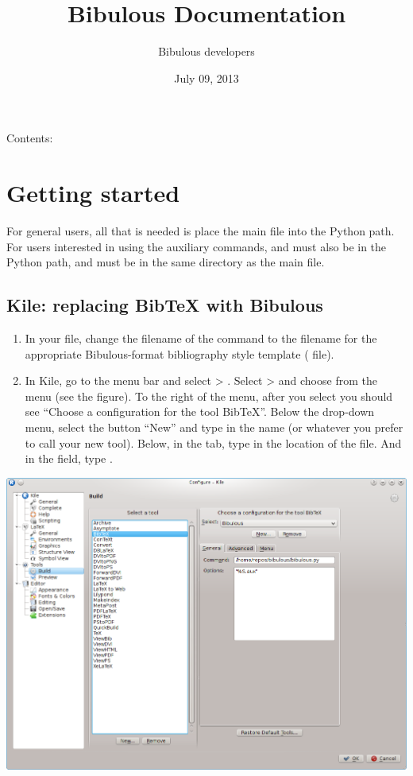 \documentclass[letterpaper,10pt,english]{sphinxmanual}
\title{Bibulous Documentation}
\date{July 09, 2013}
\author{Bibulous developers}
\begin{document}
\maketitle
\tableofcontents
{}\label{index::doc}


Contents:


\chapter{Getting started}
\label{getting_started:bibulous-documentation}\label{getting_started:getting-started}\label{getting_started::doc}
For general users, all that is needed is place the main  file into the Python path. For users interested in using the auxiliary commands,  and  must also be in the Python path, and must be in the same directory as the main file.


\section{Kile: replacing BibTeX with Bibulous}
\label{getting_started:kile-replacing-bibtex-with-bibulous}\begin{enumerate}
\item {} 
In your  file, change the filename of the  command to the filename for the appropriate Bibulous-format bibliography style template ( file).

\item {} 
In Kile, go to the menu bar and select  \textgreater{} . Select  \textgreater{}  and choose  from the  menu (see the figure). To the right of the menu, after you select  you should see ``Choose a configuration for the tool BibTeX''. Below the drop-down menu, select the button ``New'' and type in the name  (or whatever you prefer to call your new tool). Below, in the  tab, type in the location of the  file. And in the  field, type .

\end{enumerate}

\includegraphics[width=0.490\linewidth]{screenshot_for_kile_instructions.png}
\end{document}
